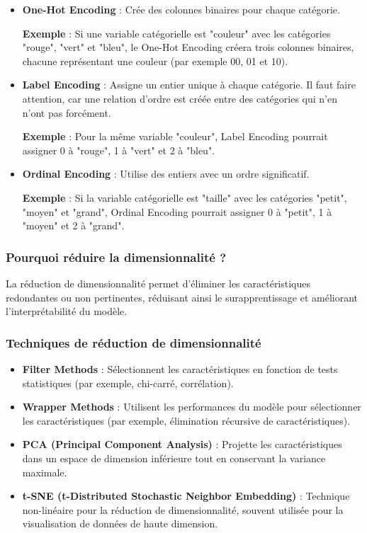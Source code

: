 \documentclass[10pt,a4paper]{article}
\begin{document}
\begin{itemize}
    \item \textbf{One-Hot Encoding} : Crée des colonnes binaires pour chaque catégorie.

    \textbf{Exemple} : Si une variable catégorielle est "couleur" avec les catégories "rouge", "vert" et "bleu", le One-Hot Encoding créera trois colonnes binaires, chacune représentant une couleur (par exemple 00, 01 et 10).

    \item \textbf{Label Encoding} : Assigne un entier unique à chaque catégorie. Il faut faire attention, car une relation d'ordre est créée entre des catégories qui n'en n'ont pas forcément.

    \textbf{Exemple} : Pour la même variable "couleur", Label Encoding pourrait assigner 0 à "rouge", 1 à "vert" et 2 à "bleu".

    \item \textbf{Ordinal Encoding} : Utilise des entiers avec un ordre significatif.

    \textbf{Exemple} : Si la variable catégorielle est "taille" avec les catégories "petit", "moyen" et "grand", Ordinal Encoding pourrait assigner 0 à "petit", 1 à "moyen" et 2 à "grand".
\end{itemize}

\subsubsection*{Pourquoi réduire la dimensionnalité ?}

La réduction de dimensionnalité permet d'éliminer les caractéristiques redondantes ou non pertinentes, réduisant ainsi le surapprentissage et améliorant l'interprétabilité du modèle.

\subsubsection*{Techniques de réduction de dimensionnalité}

\begin{itemize}
    \item \textbf{Filter Methods} : Sélectionnent les caractéristiques en fonction de tests statistiques (par exemple, chi-carré, corrélation).

    \item \textbf{Wrapper Methods} : Utilisent les performances du modèle pour sélectionner les caractéristiques (par exemple, élimination récursive de caractéristiques).

    \item \textbf{PCA (Principal Component Analysis)} : Projette les caractéristiques dans un espace de dimension inférieure tout en conservant la variance maximale.

    \item \textbf{t-SNE (t-Distributed Stochastic Neighbor Embedding)} : Technique non-linéaire pour la réduction de dimensionnalité, souvent utilisée pour la visualisation de données de haute dimension.
\end{itemize}
\end{document}
